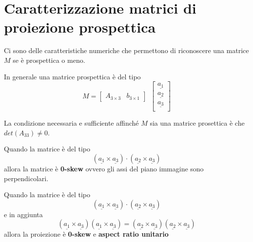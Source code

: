 \section{Caratterizzazione matrici di proiezione prospettica}
Ci sono delle caratteristiche numeriche che permettono di riconoscere una matrice 
$M$ se è prospettica o meno.

In generale una matrice prospettica è del tipo
$$M=\left[\begin{array}{c|c}
    A_{3\times3} &b_{3\times1}
\end{array}\right]  \ \ \left[\begin{array}{c}
    \underline{a_1}\\
    \underline{a_2}\\
    \underline{a_3}\\
\end{array}\right]$$

\begin{teorema}
La condizione necessaria e sufficiente affinché $M$ sia una matrice prosettica è
che $det(A_{33})\ne 0$.
\end{teorema}

\begin{teorema}
    Quando la matrice è del tipo
    $$(\underline{a_1} \times \underline{a_3})\cdot (\underline{a_2} \times \underline{a_3})$$
    allora la matrice è \textbf{0-skew} ovvero gli assi del piano immagine sono 
    perpendicolari.
\end{teorema}

\begin{teorema}
    Quando la matrice è del tipo
    $$(\underline{a_1} \times \underline{a_3})\cdot (\underline{a_2} \times \underline{a_3})$$
    e in aggiunta
    $$(\underline{a_1} \times \underline{a_3})(\underline{a_1} \times \underline{a_3}) = (\underline{a_2} \times \underline{a_3})(\underline{a_2} \times \underline{a_3})$$
    allora la proiezione è \textbf{0-skew} e \textbf{aspect ratio unitario}
\end{teorema}
